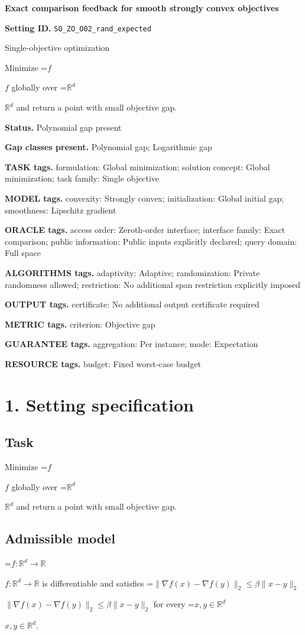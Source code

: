 \documentclass[10pt,a4paper]{article}
\newcommand{\AtlasMath}[1]{\par\begingroup\centering\setbox0=\hbox{$\displaystyle #1$}\ifdim\wd0>1.4\linewidth\typeout{ATLAS WIDE FORMULA: \the\wd0}\fi\ifdim\wd0>\linewidth\resizebox{\linewidth}{!}{\box0}\else\box0\fi\par\endgroup}
\newcommand{\AtlasInlineMath}[1]{\begingroup\setbox0=\hbox{$#1$}\ifdim\wd0>.4\linewidth\endgroup\AtlasMath{#1}\else\endgroup$#1$\fi}
\begin{document}
\raggedright

{\LARGE\bfseries\sffamily\color{AtlasNavy} Exact comparison feedback for smooth strongly convex objectives\par}\vspace{5pt}
\textbf{Setting ID.} \texttt{SO\_\allowbreak{}ZO\_\allowbreak{}O02\_\allowbreak{}rand\_\allowbreak{}expected}

Single-objective optimization

Minimize \AtlasInlineMath{f} globally over \AtlasInlineMath{\mathbb{R}^d} and return a point with small objective gap.

\textbf{Status.} Polynomial gap present

\textbf{Gap classes present.} Polynomial gap; Logarithmic gap

\textbf{TASK tags.} formulation: Global minimization; solution concept: Global minimization; task family: Single objective

\textbf{MODEL tags.} convexity: Strongly convex; initialization: Global initial gap; smoothness: Lipschitz gradient

\textbf{ORACLE tags.} access order: Zeroth-order interface; interface family: Exact comparison; public information: Public inputs explicitly declared; query domain: Full space

\textbf{ALGORITHMS tags.} adaptivity: Adaptive; randomization: Private randomness allowed; restriction: No additional span restriction explicitly imposed

\textbf{OUTPUT tags.} certificate: No additional output certificate required

\textbf{METRIC tags.} criterion: Objective gap

\textbf{GUARANTEE tags.} aggregation: Per instance; mode: Expectation

\textbf{RESOURCE tags.} budget: Fixed worst-case budget

\section{1. Setting specification}
\subsection{Task}
Minimize \AtlasInlineMath{f} globally over \AtlasInlineMath{\mathbb{R}^d} and return a point with small objective gap.

\subsection{Admissible model}
\AtlasInlineMath{f:\mathbb{R}^d\to\mathbb{R}} is differentiable and satisfies \AtlasInlineMath{\|\nabla f(x)-\nabla f(y)\|_2\le\beta\|x-y\|_2} for every \AtlasInlineMath{x,y\in\mathbb{R}^d}.
\end{document}
